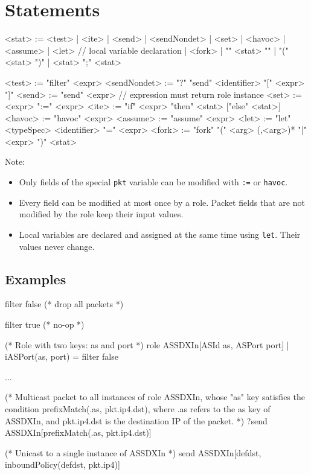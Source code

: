 \documentclass{report}
\begin{document}
\section{Statements}

\begin{bnflisting}{}
<stat> := <test> 
        | <ite>
        | <send>
        | <sendNondet>
        | <set>
        | <havoc>
        | <assume>
        | <let>           // local variable declaration
        | <fork>
        | "{" <stat> "}"
        | "(" <stat> ")"
        | <stat> ";" <stat>

<test>       := "filter" <expr>
<sendNondet> := "?" "send" <identifier> "[" <expr> "]"
<send>       := "send" <expr> // expression must return role instance
<set>        := <expr> ":=" <expr>
<ite>        := "if" <expr> "then" <stat> ["else" <stat>]
<havoc>      := "havoc" <expr>
<assume>     := "assume" <expr>
<let>        := "let" <typeSpec> <identifier> "=" <expr>
<fork>       := "fork" "(" <arg> (,<arg>)* "|" <expr> ")" <stat>
\end{bnflisting}

Note:
\begin{itemize}
    \item Only fields of the special \texttt{pkt} variable can be modified 
        with \texttt{:=} or \texttt{havoc}.
    \item Every field can be modified at most once by a role.  Packet fields
        that are not modified by the role keep their input values.        
    \item Local variables are declared and assigned at the same time using 
        \texttt{let}.  Their values never change.
\end{itemize}

\subsection*{Examples}

\begin{ccnlisting}{}
filter false (* drop all packets *)
\end{ccnlisting}

\begin{ccnlisting}{}
filter true (* no-op *)
\end{ccnlisting}

\begin{ccnlisting}{}
(* Role with two keys: as and port *)
role ASSDXIn[ASId as, ASPort port] | iASPort(as, port) = filter false

...

(* Multicast packet to all instances of role ASSDXIn, whose "as" key satisfies the
   condition prefixMatch(.as, pkt.ip4.dst), where .as refers to the as key
   of ASSDXIn, and pkt.ip4.dst is the destination IP of the packet.  *)
?send ASSDXIn[prefixMatch(.as, pkt.ip4.dst)]

(* Unicast to a single instance of ASSDXIn *)
send ASSDXIn[defdst, inboundPolicy(defdst, pkt.ip4)]
\end{ccnlisting}
\end{document}
